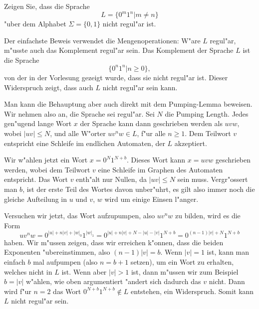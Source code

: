 Zeigen Sie, dass die Sprache
\[
L=\{
0^m1^n|m\ne n
\}
\]
"uber dem Alphabet $\Sigma=\{0,1\}$ nicht regul"ar ist.

\begin{loesung}
Der einfachste Beweis verwendet die Mengenoperationen:
W"are $L$ regul"ar, m"usste auch das Komplement regul"ar sein.
Das Komplement der Sprache $L$ ist die Sprache
$$\{0^n1^n|n\ge 0\},$$
von der in der Vorlesung gezeigt wurde, dass sie nicht regul"ar
ist. Dieser Widerspruch zeigt, dass auch $L$ nicht regul"ar sein kann.

Man kann die Behauptung aber auch direkt mit dem Pumping-Lemma beweisen.
Wir nehmen also an, die Sprache sei regul"ar. Sei $N$ die Pumping Length.
Jedes gen"ugend lange Wort $x$ der Sprache kann dann geschrieben werden als $uvw$,
wobei $|uv|\le N$, und alle W"orter $uv^nw\in L$, f"ur alle $n\ge 1$.
Dem Teilwort $v$ entspricht eine Schleife im endlichen Automaten, der
$L$ akzeptiert.

Wir w"ahlen jetzt ein Wort $x=0^N1^{N+b}$. Dieses Wort kann
$x=uvw$ geschrieben werden, wobei dem Teilwort $v$ eine Schleife im
Graphen des Automaten entspricht.
Das Wort $v$ enth"alt nur Nullen, da $|uv|\le N$ sein muss. Vergr"ossert
man $b$, ist der erste Teil des Wortes davon unber"uhrt, es gilt also immer
noch die gleiche Aufteilung in $u$ und $v$, $w$ wird um einige Einsen l"anger.

Versuchen wir jetzt, das Wort aufzupumpen, also $uv^nw$ zu bilden, wird es
die Form
$$uv^nw=0^{|u|+n|v|+|w|_0}1^{|w|_1}
=
0^{|u|+n|v|+N-|u|-|v|}1^{N+b}
=
0^{(n-1)|v|+N}1^{N+b}
$$
haben. Wir m"ussen zeigen, dass wir erreichen k"onnen, dass die beiden
Exponenten "ubereinstimmen, also $(n-1)|v|=b$. Wenn $|v|=1$ ist, kann man
einfach $b$ mal aufpumpen (also $n=b+1$ setzen), um ein Wort zu erhalten,
welches nicht in $L$ ist.
Wenn aber $|v|>1$ ist, dann m"ussen wir zum Beispiel $b=|v|$ w"ahlen,
wie oben argumentiert "andert sich dadurch das $v$ nicht. Dann wird f"ur
$n=2$ das Wort $0^{N+b}1^{N+b}\not\in L$ entstehen, ein Widerspruch. Somit
kann $L$ nicht regul"ar sein.
\end{loesung}
